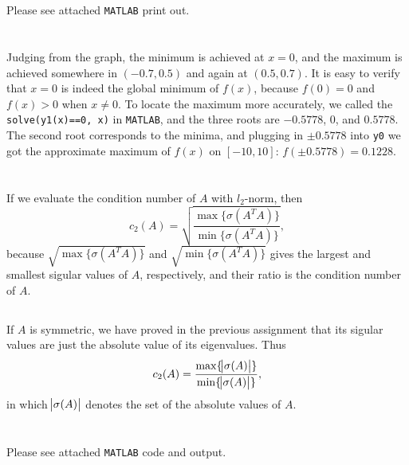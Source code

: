 \documentclass[11pt]{article}
\begin{document}
\maketitle
\section{}
Please see attached \texttt{MATLAB} print out.
\section{}
Judging from the graph, the minimum is achieved at $x=0$, and the maximum is achieved somewhere in $(-0.7, 0.5)$ and again at $(0.5, 0.7)$. It is easy to verify that $x=0$ is indeed the global minimum of $f(x)$, because $f(0) = 0$ and $f(x)>0$ when $x\neq0$. To locate the maximum more accurately, we called the \texttt{solve(y1(x)==0, x)} in \texttt{MATLAB}, and the three roots are $-0.5778$, $0$, and $0.5778$. The second root corresponds to the minima, and plugging in $\pm0.5778$ into \texttt{y0} we got the approximate maximum of $f(x)$ on $[-10, 10]$: $f(\pm0.5778) = 0.1228$.
\section{}
\subsection{}
If we evaluate the condition number of $A$ with $l_2$-norm, then 
$$c_2(A) = \sqrt{\frac{\max\{\sigma(A^TA)\}}{\min\{\sigma(A^TA)\}}},$$
because $\sqrt{\max\{\sigma(A^TA) \}}$ and $\sqrt{\min\{\sigma(A^TA) \}}$ gives the largest and smallest sigular values of $A$, respectively, and their ratio is the condition number of $A$.
\subsection{}
If $A$ is symmetric, we have proved in the previous assignment that its sigular values are just the absolute value of its eigenvalues. Thus 
$$c_2(A) = \frac{\max\{\abs{\sigma(A)} \}}{\min\{\abs{\sigma(A)} \}},$$
in which $\abs{\sigma(A)}$ denotes the set of the absolute values of $A$.
\subsection{}

\section{}
Please see attached \texttt{MATLAB} code and output.
\end{document}
